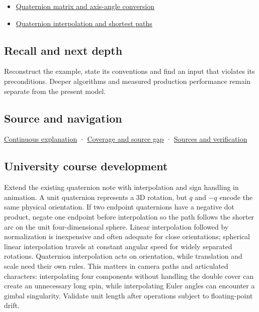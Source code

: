 \hypertarget{appendix-8e61ab68f6b2-used-by}{}

\begin{itemize}
\tightlist
\item
  \hyperref[appendix-26d8da71f6c4]{Quaternion matrix and axis-angle conversion}
\item
  \hyperref[appendix-9b4b8254f26b]{Quaternion interpolation and shortest paths}
\end{itemize}

\subsection{Recall and next depth}\label{appendix-8e61ab68f6b2-recall-and-next-depth}

\hypertarget{appendix-8e61ab68f6b2-recall-and-next-depth}{}

Reconstruct the example, state its conventions and find an input that violates its preconditions. Deeper algorithms and measured production performance remain separate from the present model.

\subsection{Source and navigation}\label{appendix-8e61ab68f6b2-source-and-navigation}

\hypertarget{appendix-8e61ab68f6b2-source-and-navigation}{}

\hyperref[01-foundations-i-ch018-keep-the-promises-visible-while-moving-between-representations]{Continuous explanation} · \hyperref[appendix-fd090d982a15-phase-7---parts-601-700]{Coverage and source gap} · \hyperref[appendix-a103e7846d21-phase-7---source-analysis-and-verification]{Sources and verification}

\subsection{University course development}\label{appendix-8e61ab68f6b2-university-course-development}

\hypertarget{appendix-8e61ab68f6b2-university-course-development}{}

Extend the existing quaternion note with interpolation and sign handling in animation. A unit quaternion represents a 3D rotation, but \(q\) and \(-q\) encode the same physical orientation. If two endpoint quaternions have a negative dot product, negate one endpoint before interpolation so the path follows the shorter arc on the unit four-dimensional sphere. Linear interpolation followed by normalization is inexpensive and often adequate for close orientations; spherical linear interpolation travels at constant angular speed for widely separated rotations. Quaternion interpolation acts on orientation, while translation and scale need their own rules. This matters in camera paths and articulated characters: interpolating four components without handling the double cover can create an unnecessary long spin, while interpolating Euler angles can encounter a gimbal singularity. Validate unit length after operations subject to floating-point drift.

